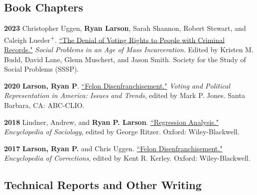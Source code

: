 \documentclass[letterpaper]{article}
\newenvironment{publist}{%
  \begin{list}{}{%
    \setlength{\leftmargin}{0cm}   %
    \setlength{\labelwidth}{2cm}     %
    \setlength{\labelsep}{0.5cm}     %
  }%
}{%
  \end{list}%
}
\begin{document}
\subsection*{Book Chapters}

\begin{publist}

\item[\textbf{2023}] Christopher Uggen, \textbf{Ryan Larson}, Sarah Shannon, Robert Stewart, and Caleigh Lueder\textsuperscript{+}. \href{https://ryanplarson.github.io/personal_site/pubs/uggen_etal_23.pdf}{``The Denial of Voting Rights to People with Criminal Records."} \textit{Social Problems in an Age of Mass Incarceration}. Edited by Kristen M. Budd, David Lane, Glenn Muschert, and Jason Smith. Society for the Study of Social Problems (SSSP).

\item[\textbf{2020}] \textbf{Larson, Ryan P}. \href{https://ryanplarson.github.io/personal_site/pubs/larson_19.pdf}{``Felon Disenfranchisement."} \textit{Voting and Political Representation in America: Issues and Trends}, edited by Mark P. Jones. Santa Barbara, CA: ABC-CLIO.

\item[\textbf{2018}] Lindner, Andrew, and \textbf{Ryan P. Larson}. \href{https://ryanplarson.github.io/personal_site/pubs/lindner_larson_18.pdf}{``Regression Analysis."} \textit{Encyclopedia of Sociology}, edited by George Ritzer. Oxford: Wiley-Blackwell.

\item[\textbf{2017}] \textbf{Larson, Ryan P.} and Chris Uggen. \href{https://ryanplarson.github.io/personal_site/pubs/uggen_larson_17.pdf}{``Felon Disenfranchisement."} \textit{Encyclopedia of Corrections}, edited by Kent R. Kerley. Oxford: Wiley-Blackwell.

\end{publist}


\subsection*{Technical Reports and Other Writing}
\end{document}
